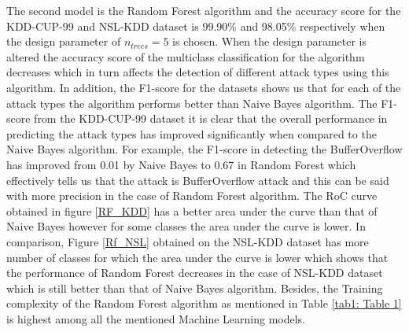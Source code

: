 \documentclass[conference]{IEEEtran}
\begin{document}
The second model is the Random Forest algorithm \cite{random_forest} and the accuracy score for the KDD-CUP-99 and NSL-KDD dataset is 99.90\% and 98.05\% respectively when the design parameter of $n_{trees} = 5$ is chosen. When the design parameter is altered the accuracy score of the multiclass classification for the algorithm decreases which in turn affects the detection of different attack types using this algorithm. In addition, the F1-score for the datasets shows us that for each of the attack types the algorithm performs better than Naive Bayes \cite{NB} algorithm. The F1-score from the KDD-CUP-99 dataset it is clear that the overall performance in predicting the attack types has improved significantly when compared to the Naive Bayes algorithm. For example, the F1-score in detecting the BufferOverflow has improved from 0.01 by Naive Bayes to 0.67 in Random Forest which effectively tells us that the attack is BufferOverflow attack and this can be said with more precision in the case of Random Forest algorithm. The RoC curve obtained in figure \ref{RF_KDD} has a better area under the curve than that of Naive Bayes however for some classes the area under the curve is lower. In comparison, Figure \ref{Rf_NSL} obtained on the NSL-KDD dataset has more number of classes for which the area under the curve is lower which shows that the performance of Random Forest decreases in the case of NSL-KDD dataset which is still better than that of Naive Bayes algorithm. Besides, the Training complexity of the Random Forest algorithm as mentioned in Table \ref{tab1: Table 1} is highest among all the mentioned Machine Learning models. 
\end{document}
